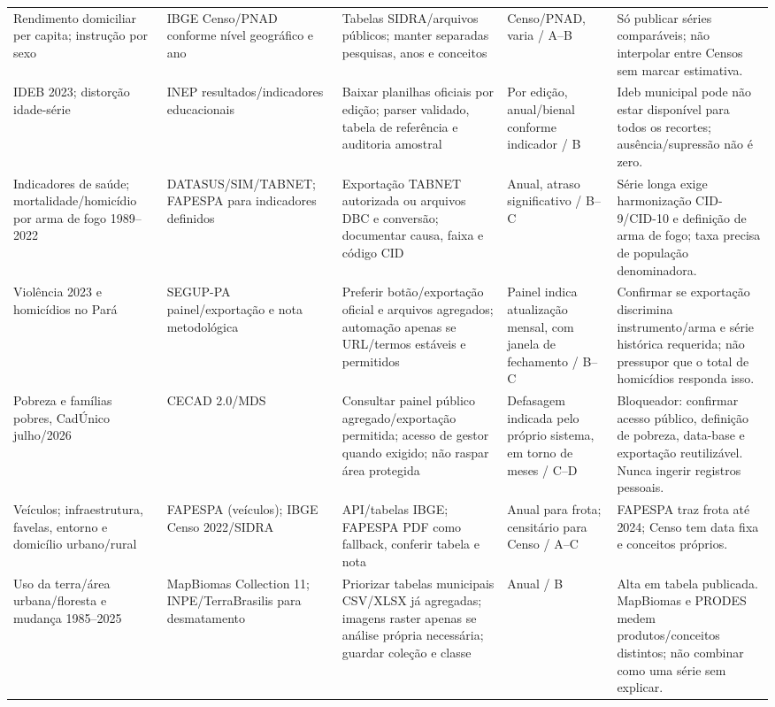 \documentclass[12pt]{article}
\begin{document}
\begin{longtable}{p{} p{} p{} p{} p{}}
Rendimento domiciliar per capita; instrução por sexo & IBGE Censo/PNAD conforme nível geográfico e ano \cite{ibgeapi} & Tabelas SIDRA/arquivos públicos; manter separadas pesquisas, anos e conceitos & Censo/PNAD, varia / A--B & Só publicar séries comparáveis; não interpolar entre Censos sem marcar estimativa.\\
IDEB 2023; distorção idade-série & INEP resultados/indicadores educacionais \cite{inep} & Baixar planilhas oficiais por edição; parser validado, tabela de referência e auditoria amostral & Por edição, anual/bienal conforme indicador / B & Ideb municipal pode não estar disponível para todos os recortes; ausência/supressão não é zero.\\
Indicadores de saúde; mortalidade/homicídio por arma de fogo 1989--2022 & DATASUS/SIM/TABNET; FAPESPA para indicadores definidos \cite{datasus} & Exportação TABNET autorizada ou arquivos DBC e conversão; documentar causa, faixa e código CID & Anual, atraso significativo / B--C & Série longa exige harmonização CID-9/CID-10 e definição de arma de fogo; taxa precisa de população denominadora.\\
Violência 2023 e homicídios no Pará & SEGUP-PA painel/exportação e nota metodológica \cite{segup} & Preferir botão/exportação oficial e arquivos agregados; automação apenas se URL/termos estáveis e permitidos & Painel indica atualização mensal, com janela de fechamento / B--C & Confirmar se exportação discrimina instrumento/arma e série histórica requerida; não pressupor que o total de homicídios responda isso.\\
Pobreza e famílias pobres, CadÚnico julho/2026 & CECAD 2.0/MDS \cite{cecad} & Consultar painel público agregado/exportação permitida; acesso de gestor quando exigido; não raspar área protegida & Defasagem indicada pelo próprio sistema, em torno de meses / C--D & Bloqueador: confirmar acesso público, definição de pobreza, data-base e exportação reutilizável. Nunca ingerir registros pessoais.\\
Veículos; infraestrutura, favelas, entorno e domicílio urbano/rural & FAPESPA (veículos); IBGE Censo 2022/SIDRA \cite{fapespa,ibgeapi} & API/tabelas IBGE; FAPESPA PDF como fallback, conferir tabela e nota & Anual para frota; censitário para Censo / A--C & FAPESPA traz frota até 2024; Censo tem data fixa e conceitos próprios.\\
Uso da terra/área urbana/floresta e mudança 1985--2025 & MapBiomas Collection 11; INPE/TerraBrasilis para desmatamento \cite{mapbiomas,inpe} & Priorizar tabelas municipais CSV/XLSX já agregadas; imagens raster apenas se análise própria necessária; guardar coleção e classe & Anual / B & Alta em tabela publicada. MapBiomas e PRODES medem produtos/conceitos distintos; não combinar como uma série sem explicar.\\

\end{longtable}
\end{document}
